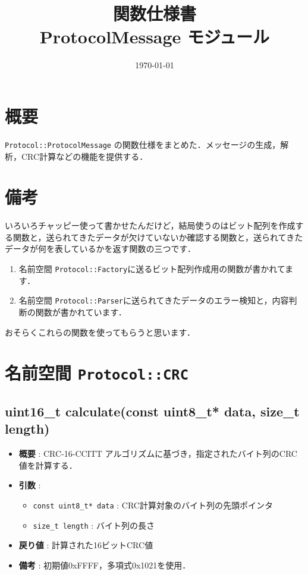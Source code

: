 \documentclass[a4paper,12pt]{article}
\title{関数仕様書 \\ \large ProtocolMessage モジュール}
\author{}
\date{\today}
\begin{document}
\maketitle
\tableofcontents
\newpage

\section{概要}
\texttt{Protocol::ProtocolMessage} の関数仕様をまとめた．メッセージの生成，解析，CRC計算などの機能を提供する．

\section{備考}
いろいろチャッピー使って書かせたんだけど，結局使うのはビット配列を作成する関数と，送られてきたデータが欠けていないか確認する関数と，送られてきたデータが何を表しているかを返す関数の三つです．
\begin{enumerate}
\item 名前空間 \texttt{Protocol::Factory}に送るビット配列作成用の関数が書かれてます．
\item 名前空間 \texttt{Protocol::Parser}に送られてきたデータのエラー検知と，内容判断の関数が書かれています．
\end{enumerate}

おそらくこれらの関数を使ってもらうと思います．

\section{名前空間 \texttt{Protocol::CRC}}

\subsection{uint16\_t calculate(const uint8\_t* data, size\_t length)}
\begin{itemize}
  \item \textbf{概要} : CRC-16-CCITT アルゴリズムに基づき，指定されたバイト列のCRC値を計算する．
  \item \textbf{引数} :
  \begin{itemize}
    \item \texttt{const uint8\_t* data} : CRC計算対象のバイト列の先頭ポインタ
    \item \texttt{size\_t length} : バイト列の長さ
  \end{itemize}
  \item \textbf{戻り値} : 計算された16ビットCRC値
  \item \textbf{備考} : 初期値0xFFFF，多項式0x1021を使用．
\end{itemize}
\end{document}
